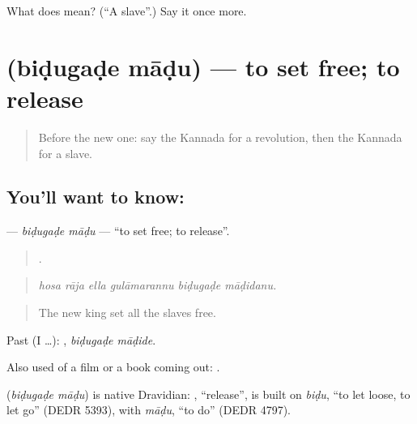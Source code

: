 \begin{tcolorbox}[breakable,colback=teal!4,colframe=teal!35!black,title={Before you move on}]
What does  mean? (\textquotedblleft{}A slave\textquotedblright{}.) Say it once more.
\end{tcolorbox}
\section[\texorpdfstring{\kn{ಬಿಡುಗಡೆ} \kn{ಮಾಡು} (biḍugaḍe māḍu)}{ಬಿಡುಗಡೆ ಮಾಡು (biḍugaḍe māḍu)}]{  (biḍugaḍe māḍu) — to set free; to release}

\label{lesson:KA-C352-bidugade-madu}



\begin{quote}
Before the new one: say the Kannada for a revolution, then the Kannada for a slave.
\end{quote}

\subsection*{You'll want to know:  }
\textbf{ } — \emph{biḍugaḍe māḍu} — \textquotedblleft{}to set free; to release\textquotedblright{}.

\begin{quote}
     .
\end{quote}

\begin{quote}
\emph{hosa rāja ella gulāmarannu biḍugaḍe māḍidanu.}
\end{quote}

\begin{quote}
The new king set all the slaves free.
\end{quote}

Past (I …):  , \emph{biḍugaḍe māḍide}.

Also used of a film or a book coming out:   .

\begin{cousinweb}
\textbf{ } (\emph{biḍugaḍe māḍu}) is native Dravidian: , \textquotedblleft{}release\textquotedblright{}, is built on \emph{biḍu}, \textquotedblleft{}to let loose, to let go\textquotedblright{} (DEDR 5393), with \emph{māḍu}, \textquotedblleft{}to do\textquotedblright{} (DEDR 4797).
\end{cousinweb}

